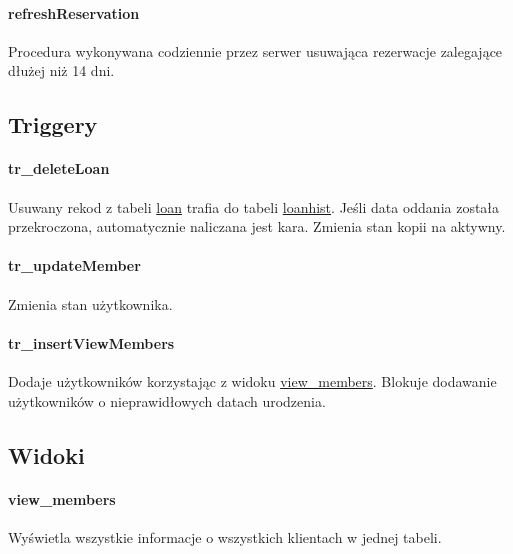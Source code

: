 \documentclass[12pt,a4paper,titlepage]{article}
\begin{document}
\paragraph{refreshReservation}
Procedura wykonywana codziennie przez serwer usuwająca rezerwacje zalegające dłużej niż 14 dni.




\subsection{Triggery}
\paragraph{tr\_deleteLoan}
Usuwany rekod z tabeli \underline{loan} trafia do tabeli \underline{loanhist}. Jeśli data oddania została przekroczona, automatycznie naliczana jest kara.
Zmienia stan kopii na aktywny.

\paragraph{tr\_updateMember}
Zmienia stan użytkownika.

\paragraph{tr\_insertViewMembers}
Dodaje użytkowników korzystając z widoku \underline{view\_members}. Blokuje dodawanie użytkowników o nieprawidłowych datach urodzenia.




\subsection{Widoki}

\paragraph{view\_members}
Wyświetla wszystkie informacje o wszystkich klientach w jednej tabeli.
\end{document}

